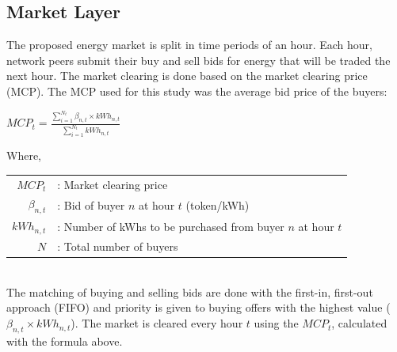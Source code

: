 \subsection{Market Layer}
The proposed energy market is split in time periods of an hour. Each hour, network peers submit their buy and sell
bids for energy that will be traded the next hour. The market clearing is done based on the market clearing price (MCP).
The MCP used for this study was the average bid price of the buyers:
\begin{center}
    \begin{math}
        MCP_t = \frac{\sum_{i=1}^{N_t} \beta_{n,t} \times kWh_{n,t}}{\sum_{i=1}^{N_t} kWh_{n,t}}
    \end{math}
\end{center}
Where,\\
\begin{tabular}{rl}
    $MCP_t$       & :  Market clearing price                                     \\
    $\beta_{n,t}$ & :  Bid of buyer $n$ at hour $t$ (token/kWh)                  \\
    $kWh_{n,t}$   & :  Number of kWhs to be purchased from buyer $n$ at hour $t$ \\
    $N$           & :  Total number of buyers                                    \\
\end{tabular}\\
The matching of buying and selling bids are done with the first-in, first-out approach (FIFO) and priority is given to
buying offers with the highest value ($\beta_{n,t}\times kWh_{n,t}$). The market is cleared every hour $t$ using the
$MCP_t$, calculated with the formula above. \cite{Pipattanasomporn2013}

